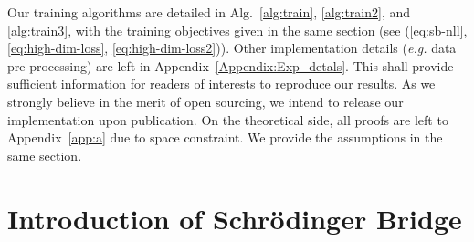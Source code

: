 \documentclass{article}
\def\wt{{ \mathbf{W}_t }}
\def\dwt{{ \mathrm{d} \wt }}
\newcommand{\eg}{{\ignorespaces\emph{e.g.}}{ }}
\begin{document}
Our training algorithms are detailed in Alg.~\ref{alg:train}, \ref{alg:train2}, and \ref{alg:train3}, with the training objectives given in the same section (see (\ref{eq:sb-nll}, \ref{eq:high-dim-loss}, \ref{eq:high-dim-loss2})). Other implementation details (\eg data pre-processing) are left in Appendix~\ref{Appendix:Exp_detals}. This shall provide sufficient information for readers of interests to reproduce our results. As we strongly believe in the merit of open sourcing, we intend to release our implementation upon publication. On the theoretical side, all proofs are left to Appendix~\ref{app:a} due to space constraint. We provide the assumptions in the same section.








\newpage
\appendix


\def\dWt{{\dwt}}


\section{Introduction of Schr{\"o}dinger Bridge}\label{app:d1}
\end{document}
